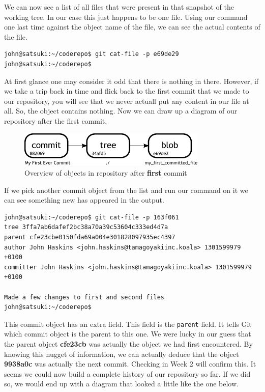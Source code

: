 We can now see a list of all files that were present in that snapshot of the working tree.  In our case this just happens to be one file.  Using our command one last time against the object name of the file, we can see the actual contents of the file.

\begin{Verbatim}[frame=leftline,framerule=1mm,fontsize=\relsize{-3}]
john@satsuki:~/coderepo$ git cat-file -p e69de29
john@satsuki:~/coderepo$ 
\end{Verbatim}

At first glance one may consider it odd that there is nothing in there.  However, if we take a trip back in time and flick back to the first commit that we made to our repository, you will see that we never actuall put any content in our file at all.  So, the object contains nothing.  Now we can draw up a diagram of our repository after the first commit.

\begin{figure}[hbt]
\centering
\includegraphics[width=9cm]{images/f-af2-d2.pdf}
\caption{Overview of objects in repository after \textbf{first} commit}
\end{figure}

If we pick another commit object from the list and run our command on it we can see something new has appeared in the output.

\begin{Verbatim}[frame=leftline,framerule=1mm,fontsize=\relsize{-3}]
john@satsuki:~/coderepo$ git cat-file -p 163f061
tree 3ffa7ab6dafef2bc38a70a39c53604c333ed4d7a
parent cfe23cbe0150fda69a004e301828097935ec4397
author John Haskins <john.haskins@tamagoyakiinc.koala> 1301599979 +0100
committer John Haskins <john.haskins@tamagoyakiinc.koala> 1301599979 +0100

Made a few changes to first and second files
john@satsuki:~/coderepo$ 
\end{Verbatim}

This commit object has an extra field.  This field is the \texttt{parent} field.  It tells Git which commit object is the parent to this one.  We were lucky in our guess that the parent object \textbf{cfe23cb} was actually the object we had first encountered.  By knowing this nugget of information, we can actually deduce that the object \textbf{9938a0c} was actually the next commit.  Checking in Week 2 will confirm this.  It seems we could now build a complete history of our repository so far.  If we did so, we would end up with a diagram that looked a little like the one below.

